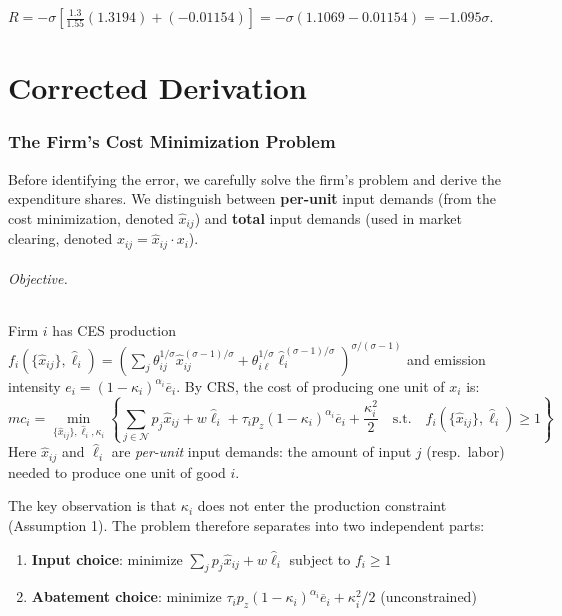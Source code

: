 \documentclass[11pt]{article}
\newcommand{\N}{\mathcal{N}}
\begin{document}
$R = -\sigma\left[\frac{1.3}{1.55}(1.3194) + (-0.01154)\right] = -\sigma(1.1069 - 0.01154) = -1.095\sigma$. \checkmark


\newpage
\part*{Corrected Derivation}

\section{The Firm's Cost Minimization Problem}

Before identifying the error, we carefully solve the firm's problem and derive the expenditure shares. We distinguish between \textbf{per-unit} input demands (from the cost minimization, denoted $\hat{x}_{ij}$) and \textbf{total} input demands (used in market clearing, denoted $x_{ij} = \hat{x}_{ij} \cdot x_i$).

\paragraph{Objective.} Firm $i$ has CES production $f_i(\{\hat{x}_{ij}\}, \hat{\ell}_i) = \left(\sum_j \theta_{ij}^{1/\sigma} \hat{x}_{ij}^{(\sigma-1)/\sigma} + \theta_{i\ell}^{1/\sigma}\hat{\ell}_i^{(\sigma-1)/\sigma}\right)^{\sigma/(\sigma-1)}$ and emission intensity $e_i = (1-\kappa_i)^{\alpha_i}\overline{e}_i$. By CRS, the cost of producing one unit of $x_i$ is:
\begin{equation}
    \label{eq:firm_cost}
    mc_i = \min_{\{\hat{x}_{ij}\}, \hat{\ell}_i, \kappa_i} \left\{\sum_{j \in \N} p_j \hat{x}_{ij} + w\hat{\ell}_i + \tau_i p_z (1-\kappa_i)^{\alpha_i}\overline{e}_i + \frac{\kappa_i^2}{2} \quad \text{s.t.} \quad f_i(\{\hat{x}_{ij}\}, \hat{\ell}_i) \geq 1 \right\}
\end{equation}
Here $\hat{x}_{ij}$ and $\hat{\ell}_i$ are \textit{per-unit} input demands: the amount of input $j$ (resp.\ labor) needed to produce one unit of good $i$.

The key observation is that $\kappa_i$ does not enter the production constraint (Assumption 1). The problem therefore separates into two independent parts:
\begin{enumerate}
    \item[(i)] \textbf{Input choice}: minimize $\sum_j p_j \hat{x}_{ij} + w\hat{\ell}_i$ subject to $f_i \geq 1$
    \item[(ii)] \textbf{Abatement choice}: minimize $\tau_i p_z(1-\kappa_i)^{\alpha_i}\overline{e}_i + \kappa_i^2/2$ (unconstrained)
\end{enumerate}
\end{document}
